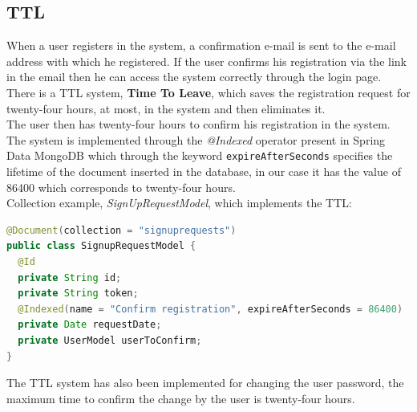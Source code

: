 \subsection{TTL}
\label{sec:TTL}
When a user registers in the system, a confirmation e-mail is sent to the e-mail address with which he registered. If the user confirms his registration via the link in the email then he can access the system correctly through the login page.\\
There is a TTL system, \textbf{Time To Leave}, which saves the registration request for twenty-four hours, at most, in the system and then eliminates it.\\
The user then has twenty-four hours to confirm his registration in the system.\\
The system is implemented through the \textit{@Indexed} operator present in Spring Data MongoDB which through the keyword \texttt{expireAfterSeconds} specifies the lifetime of the document inserted in the database, in our case it has the value of 86400 which corresponds to twenty-four hours.\\
Collection example, \textit{SignUpRequestModel}, which implements the TTL: 
\begin{lstlisting}[language=Java]
@Document(collection = "signuprequests")
public class SignupRequestModel {
  @Id
  private String id;
  private String token;
  @Indexed(name = "Confirm registration", expireAfterSeconds = 86400)
  private Date requestDate;
  private UserModel userToConfirm;
}
\end{lstlisting}
The TTL system has also been implemented for changing the user password, the maximum time to confirm the change by the user is twenty-four hours.



